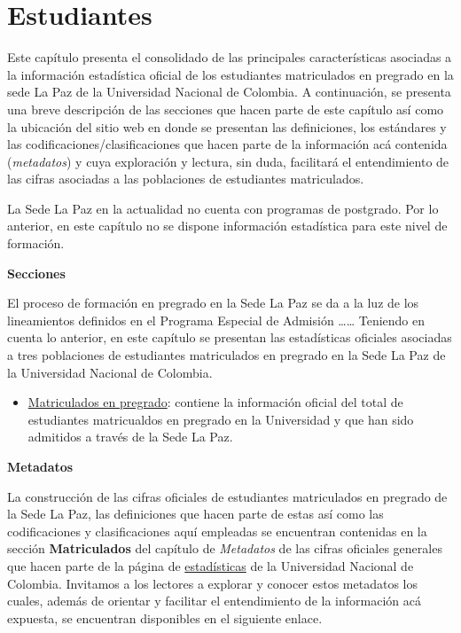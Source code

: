 \documentclass[
]{book}
\providecommand{\tightlist}{%
  \setlength{\itemsep}{0pt}\setlength{\parskip}{0pt}}
\begin{document}
\hypertarget{Estudiantes}{%
\chapter{Estudiantes}\label{Estudiantes}}

Este capítulo presenta el consolidado de las principales características asociadas a la información estadística oficial de los estudiantes matriculados en pregrado en la sede La Paz de la Universidad Nacional de Colombia. A continuación, se presenta una breve descripción de las secciones que hacen parte de este capítulo así como la ubicación del sitio web en donde se presentan las definiciones, los estándares y las codificaciones/clasificaciones que hacen parte de la información acá contenida (\emph{metadatos}) y cuya exploración y lectura, sin duda, facilitará el entendimiento de las cifras asociadas a las poblaciones de estudiantes matriculados.

La Sede La Paz en la actualidad no cuenta con programas de postgrado. Por lo anterior, en este capítulo no se dispone información estadística para este nivel de formación.

\textbf{Secciones}

El proceso de formación en pregrado en la Sede La Paz se da a la luz de los lineamientos definidos en el Programa Especial de Admisión \ldots\ldots{} Teniendo en cuenta lo anterior, en este capítulo se presentan las estadísticas oficiales asociadas a tres poblaciones de estudiantes matriculados en pregrado en la Sede La Paz de la Universidad Nacional de Colombia.

\begin{itemize}
\tightlist
\item
  \protect\hyperlink{MatPre}{Matriculados en pregrado}: contiene la información oficial del total de estudiantes matricualdos en pregrado en la Universidad y que han sido admitidos a través de la Sede La Paz.
\end{itemize}

\textbf{Metadatos}

La construcción de las cifras oficiales de estudiantes matriculados en pregrado de la Sede La Paz, las definiciones que hacen parte de estas así como las codificaciones y clasificaciones aquí empleadas se encuentran contenidas en la sección \textbf{Matriculados} del capítulo de \emph{Metadatos} de las cifras oficiales generales que hacen parte de la página de \href{http://estadisticas.unal.edu.co/home/}{estadísticas} de la Universidad Nacional de Colombia. Invitamos a los lectores a explorar y conocer estos metadatos los cuales, además de orientar y facilitar el entendimiento de la información acá expuesta, se encuentran disponibles en el siguiente enlace.
\end{document}
